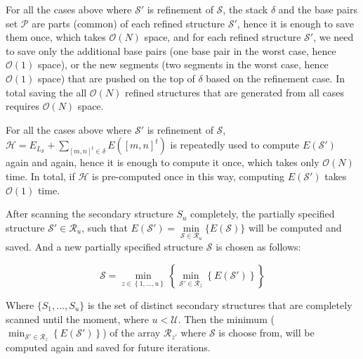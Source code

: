 \documentclass[11pt,letterpaper]{article}  \usepackage[margin=1in]{geometry}
\theoremstyle{definition}  \newtheorem{Definition}[theorem]{Definition}
\begin{document}
\begin{remark}\label{remark:spaceE}
	For all the cases above where  $\mathcal{S}'$ is refinement of $\mathcal{S}$,  the stack $\delta$ and the base pairs set $\mathcal{P}$ are parts (common) of each refined structure  $\mathcal{S}'$,  hence it is enough to save them once, which  takes $\mathcal{O}(N)$ space, and for each refined structure $\mathcal{S}'$, we need to save only the additional base pairs (one base pair in the worst case, hence $\mathcal{O}(1)$ space), or the new segments (two segments in the worst case, hence $\mathcal{O}(1)$ space) that are pushed on the top of $\delta$ based on the refinement case. In total saving the all $\mathcal{O}(N)$ refined structures that are generated from all cases requires $\mathcal{O}(N)$ space.   
	
	
\end{remark}  

\begin{remark}\label{remark:timeE}
	For all the cases above where  $\mathcal{S}'$ is refinement of $\mathcal{S}$,  $\mathcal{H} = E_{L_{\mathcal{S}}} + \sum_{[m,n]^t \in \delta} E([m,n]^t)$ 
	is repeatedly used to compute $E(\mathcal{S}')$ again and again, hence it is enough to compute it once, which takes only $\mathcal{O}(N)$ time. 
	In total, if $\mathcal{H}$ is pre-computed once in this way, computing $E(\mathcal{S}')$ takes $\mathcal{O}(1)$ time. 
\end{remark} 


After scanning the secondary structure $S_u$ completely, the partially specified structure $\mathcal{S}' \in \mathcal{R}_u$, such that $E(\mathcal{S}') =  \min\limits_{\mathcal{S} \in \mathcal{R}_u}\{ E(\mathcal{S})\}$ will be computed and saved. And a new partially specified structure $\mathcal{S}$ is chosen as follows:

\begin{equation} \label{eq:newS}
	\mathcal{S} = \min\limits_{z \in \left\{1,\ldots,u\right\}}\left\{\min\limits_{\mathcal{S}' \in \mathcal{R}_z}\left\{ E(\mathcal{S}')\right\}\right\} 
\end{equation}

Where $\{S_1,\ldots,S_u\}$ is the set of distinct secondary structures that are completely scanned until the moment, where $u<\mathcal{U}$. Then the minimum ($\min_{\mathcal{S}' \in \mathcal{R}_z}\left\{ E(\mathcal{S}')\right\}$) of the array $\mathcal{R}_{z'}$ where $\mathcal{S}$ is choose from, will be computed again and saved for future iterations. 
\end{document}
